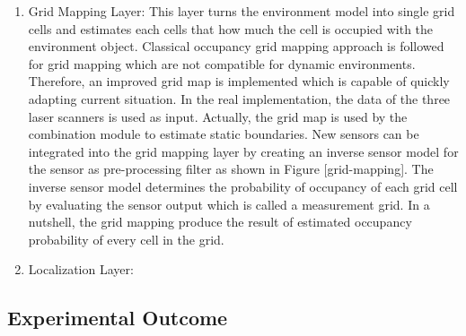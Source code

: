 \begin{enumerate}[label=\Alph*]
    \item Grid Mapping Layer: This layer turns the environment model into single grid cells and estimates each cells that how much the cell is occupied with the environment object\cite{Kunz_2015}. Classical occupancy grid mapping approach is followed for grid mapping which are not compatible for dynamic environments\cite{Kunz_2015}. Therefore, an improved  grid map is implemented which is capable of quickly adapting current situation. In the real implementation, the data of the three laser scanners is used as input. Actually, the grid map is used by the combination module to estimate static boundaries. New sensors can be integrated into the grid mapping layer by creating an inverse sensor model for the sensor as pre-processing filter as shown in Figure [grid-mapping]\cite{Kunz_2015}. The inverse sensor model determines the probability of occupancy of each grid cell by evaluating the sensor output which is called a measurement grid. In a nutshell, the grid mapping produce the result of estimated occupancy probability of every cell in the grid\cite{Kunz_2015}.
    \item Localization Layer: 
\end{enumerate}


\subsection{Experimental Outcome}


